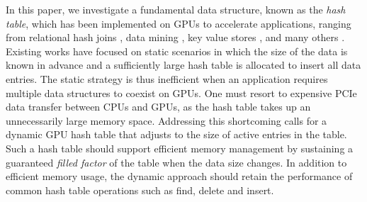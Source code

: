 In this paper, we investigate a fundamental data structure, known as the \emph{hash table}, which has been implemented on GPUs to accelerate applications, ranging from relational hash joins \cite{he2008relational,he2009relational,heimel2013hardware}, data mining \cite{pan2011fast,zhou2010parallel,zhong2014medusa},  key value stores \cite{zhang2015mega,hetherington2015memcachedgpu,breslow2016horton}, and many others \cite{bowers2010parallel,pan2010efficient,garcia2011coherent,niessner2013real,wu2015gpu}. Existing works \cite{alcantara2009real,zhang2015mega,hong2010mapcg,hetherington2015memcachedgpu,breslow2016horton} have focused on static scenarios in which the size of the data is known in advance and  a sufficiently large hash table is allocated to insert all data entries. 
The static strategy is thus inefficient when an application requires multiple data structures to coexist on GPUs. One must resort to expensive PCIe data transfer between CPUs and GPUs, as the hash table takes up an unnecessarily large memory space. 
Addressing this shortcoming calls for a dynamic GPU hash table that adjusts to the size of active entries in the table. 
Such a hash table should support efficient memory management by sustaining a guaranteed \emph{filled factor} of the table when the data size changes. 
In addition to efficient memory usage, the dynamic approach should retain the performance of common hash table operations such as find, delete and insert.

